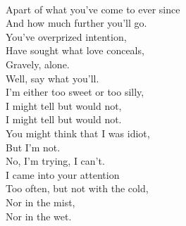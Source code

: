 \documentclass[smalldemyvopaper,11pt,twoside,onecolumn,openright,extrafontsizes]{memoir}
\begin{document}
\\Apart of what you've come to ever since
\\And how much further you'll go.
\\You've overprized intention,
\\Have sought what love conceals,
\\Gravely, alone.
\\Well, say what you'll.
\\I'm either too sweet or too silly,
\\I might tell but would not,
\\I might tell but would not.
\\You might think that I was idiot,
\\But I'm not.
\\No, I'm trying, I can't.
\\I came into your attention
\\Too often, but not with the cold,
\\Nor in the mist,
\\Nor in the wet.
\end{document}

